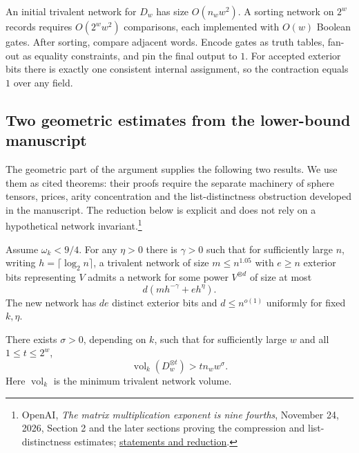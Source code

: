 An initial trivalent network for \(D_w\) has size \(O(n_ww^2)\). A sorting network on \(2^w\) records requires \(O(2^w w^2)\) comparisons, each implemented with \(O(w)\) Boolean gates. After sorting, compare adjacent words. Encode gates as truth tables, fan-out as equality constraints, and pin the final output to \(1\). For accepted exterior bits there is exactly one consistent internal assignment, so the contraction equals \(1\) over any field.

\subsection{Two geometric estimates from the lower-bound manuscript}

The geometric part of the argument supplies the following two results. We use them as cited theorems: their proofs require the separate machinery of sphere tensors, prices, arity concentration and the list-distinctness obstruction developed in the manuscript. The reduction below is explicit and does not rely on a hypothetical network invariant.\footnote{OpenAI, \emph{The matrix multiplication exponent is nine fourths}, November 24, 2026, Section 2 and the later sections proving the compression and list-distinctness estimates; \href{https://github.com/openai/math/blob/main/preprints/The-matrix-multiplication-exponent-is-nine-fourths-November-24-2026/build/obstruction.tex}{statements and reduction}.}

\begin{theorem}
\label{thm:mm-nine-fourths-compression}
Assume \(\omega_k<9/4\). For any \(\eta>0\) there is \(\gamma>0\) such that for sufficiently large \(n\), writing \(h=\lceil\log_2 n\rceil\), a trivalent network of size \(m\leq n^{1.05}\) with \(e\geq n\) exterior bits representing \(V\) admits a network for some power \(V^{\otimes d}\) of size at most
\[
 d(mh^{-\gamma}+eh^\eta).
\]
The new network has \(de\) distinct exterior bits and \(d\leq n^{o(1)}\) uniformly for fixed \(k,\eta\).
\end{theorem}

\begin{theorem}
\label{thm:mm-nine-fourths-distinctness}
There exists \(\sigma>0\), depending on \(k\), such that for sufficiently large \(w\) and all \(1\leq t\leq2^w\),
\[
 \operatorname{vol}_k(D_w^{\otimes t})>t n_w w^\sigma.
\]
Here \(\operatorname{vol}_k\) is the minimum trivalent network volume.
\end{theorem}

